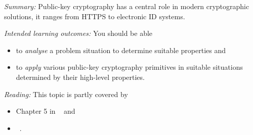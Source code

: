 \emph{Summary:}
Public-key cryptography has a central role in modern cryptographic solutions, 
it ranges from HTTPS to electronic ID systems.

\emph{Intended learning outcomes:}
You should be able
\begin{itemize}
  \item to \emph{analyse} a problem situation to determine suitable properties 
    and
  \item to \emph{apply} various public-key cryptography primitives in suitable 
    situations determined by their high-level properties.
\end{itemize}

\emph{Reading:}
This topic is partly covered by
\begin{itemize}
  \item Chapter 5 in ~\cite{Anderson2008sea} and
  \item {}~\cite{EOCS}.
\end{itemize}
